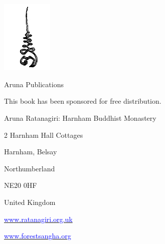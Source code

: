 \documentclass[a4paper]{article}
\newcommand\textstyleInternetlink[1]{\textcolor{blue}{#1}}
\begin{document}
\bigskip


\bigskip


\bigskip


\bigskip


\bigskip


\bigskip


\bigskip


\bigskip


\bigskip


\bigskip


\bigskip


\bigskip


\bigskip


\bigskip


\bigskip


\bigskip


\bigskip


\bigskip


\bigskip


\bigskip

 \includegraphics[width=2.432cm,height=3.498cm]{Wolfefinal2-img001.png} 


\bigskip

Aruna Publications

\clearpage
\bigskip


\bigskip

This book has been sponsored for free distribution.


\bigskip


\bigskip

Aruna Ratanagiri: Harnham Buddhist Monastery

2 Harnham Hall Cottages

Harnham, Belsay

Northumberland

NE20 0HF

United Kingdom


\bigskip


\bigskip

{\color{black}
\href{http://www.ratanagiri.org.uk/}{\textstyleInternetlink{www.ratanagiri.org.uk}}}

{\color{black}
\href{http://www.forestsangha.org/}{\textstyleInternetlink{www.forestsangha.org}}}
\end{document}
